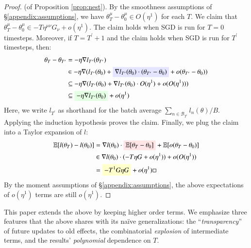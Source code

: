 \documentclass[anon,12pt]{colt2021} %
\newcommand{\pr}{\prime}
\newcommand{\expc}{\mathbb{E}}
\newcommand{\Bb}{\mathcal{B}}
\begin{document}
            \begin{proof} (of Proposition \ref{prop:nest}).
                By the smoothness assumptions of \S\ref{appendix:assumptions},
                we have $\theta_T^\mu - \theta_0^\mu \in O(\eta^1)$ for each
                $T$.  We claim that $\theta_T^\mu - \theta_0^\mu \in
                -T\eta^{\mu\nu}G_\nu + o(\eta^1)$.
                The claim holds when SGD is run for $T=0$ timesteps.  Moreover,
                if $T = T^\pr+1$ and the claim holds when SGD is run for
                $T^\pr$ timesteps, then: 
                \begin{align*}
                    \theta_{T} - \theta_{T^\pr}
                    &= - \eta \nabla l_{T^\pr}(\theta_{T^\pr}) \\
                    &\in - \eta \nabla (l_{T^\pr}(\theta_0) + \text{\colorbox{moosky}{$\nabla l_{T^\pr}(\theta_0) \cdot (\theta_{T^\pr} - \theta_0)$}} + o(\theta_{T^\pr} - \theta_0)) \\ 
                    &\subseteq - \eta \nabla (l_{T^\pr}(\theta_0) + \nabla l_{T^\pr}(\theta_0) \cdot O(\eta^1) + o(O(\eta^1))) \\
                    &\subseteq \text{\colorbox{moolime}{$- \eta \nabla l_{T^\pr}(\theta_0)$}} + o(\eta^1)
                \end{align*}
                Here, we write $l_{T^\pr}$ as shorthand for the batch average
                $\sum_{n\in \Bb_{T^\pr}} l_n(\theta) / B$.  Applying the induction
                hypothesis proves the claim.
                Finally, we plug the claim into a Taylor expansion of $l$: 
                \begin{align*}
                    \expc[l(\theta_T) - l(\theta_0)]
                    &= \nabla l(\theta_0) \cdot \text{\colorbox{moopink}{$\expc[\theta_T - \theta_0]$}} + \expc[o(\theta_T - \theta_0)] \\
                    &\in \nabla l(\theta_0) \cdot (-T\eta G + o(\eta^1)) + o(O(\eta^1)) \\
                    &= \text{\colorbox{moogold}{$-T^1G\eta G$}}+ o(\eta^1) \hfill \square
                \end{align*}
                By the moment assumptions of \S\ref{appendix:assumptions}, the
                above expectations of $o(\eta^1)$ terms are still $o(\eta^1)$.
            \end{proof}
            This paper extends the above by keeping higher order terms.
            We emphasize three features that the above shares with its na\"ive
            generalizations: the ``\emph{transparency}'' of future updates to
            old effects, the combinatorial \emph{explosion} of intermediate
            terms, and the results' \emph{polynomial} dependence on $T$.
\end{document}
